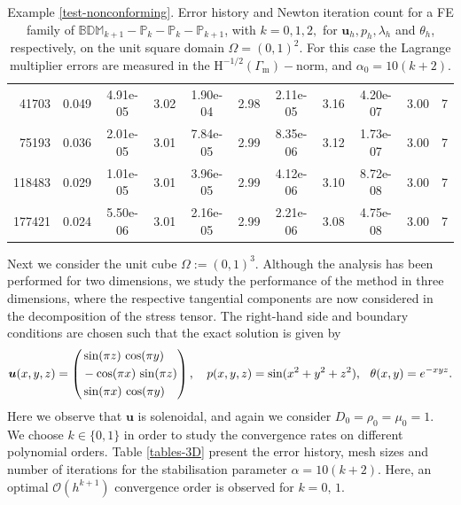\documentclass[onefignum,onetabnum,reqno,a4paper,final]{siamart250211}
\def\O{\Omega}
\newcommand\bu{\boldsymbol{u}}
\newcommand\0{\mathbf{0}}
\renewcommand\H{\mathrm{H}}
\renewcommand\O{\Omega}
\newcommand\Gm{\Gamma_{\mathrm{m}}}
\newcommand{\cred}[1]{{\leavevmode\color{red}{#1}}}
\numberwithin{figure}{section}
\numberwithin{table}{section}
\begin{document}
\begin{table}[t!]
{\begin{tabular}{|rcccccccccc|}
 41703 & 0.049 & 4.91e-05 & 3.02 & 1.90e-04 & 2.98 & 2.11e-05 & 3.16 & 4.20e-07 & 3.00 &  7 \\
 75193 & 0.036 & 2.01e-05 & 3.01 & 7.84e-05 & 2.99 & 8.35e-06 & 3.12 & 1.73e-07 & 3.00 &  7 \\
118483 & 0.029 & 1.01e-05 & 3.01 & 3.96e-05 & 2.99 & 4.12e-06 & 3.10 & 8.72e-08 & 3.00 &  7 \\
177421 & 0.024 & 5.50e-06 & 3.01 & 2.16e-05 & 2.99 & 2.21e-06 & 3.08 & 4.75e-08 & 3.00 &  7 \\
				\hline
				\hline
		\end{tabular}}
		\smallskip
		\caption{Example \ref{test-nonconforming}. 
  Error history and Newton iteration count for a FE family of $\mathbb{BDM}_{k+1}-\mathbb{P}_{k}- \mathbb{P}_{k} - \mathbb{P}_{k+1}$, with $k=0,1,2,$ for $\bu_h, p_h,\lambda_h$ and $\theta_h$, respectively, on the unit square domain $\O=(0,1)^2$. For this case the Lagrange multiplier errors are measured in the $\H^{-1/2}(\Gm)-$norm, and $\alpha_0=10(k+2)$. }
		\label{tables-1to4}
	\end{table}	
	
    Next we consider the unit cube $\O:=(0,1)^3$. Although the analysis has been performed for two dimensions, we study the performance of the method in three dimensions, where the respective tangential components are now considered in the decomposition of the stress tensor. The right-hand side and boundary conditions are chosen such that the exact solution is given by
    $$
	\bu(x,y,z)=\left(
	\begin{aligned}
		&\sin(\pi z)\,\cos(\pi y)\\
		&-\cos(\pi x)\,\sin(\pi z)\\
        &\sin(\pi x)\,\cos(\pi y)
	\end{aligned}
	\right), \quad p(x,y,z)=\sin(x^2+y^2+z^2), \quad \hspace{-0.1cm} \theta(x,y)=e^{-xyz}.
	$$
    Here we observe that $\bu$ is solenoidal, and again we consider $D_0=\rho_0=\mu_0=1$. We choose $k\in\{0,1\}$ in order to study the convergence rates on different polynomial orders.
%
    Table \ref{tables-3D} present the error history, mesh sizes and number of iterations for the stabilisation parameter $\alpha=10(k+2)$. Here, an optimal  $\mathcal{O}(h^{k+1})$ convergence order is observed for $k=0, \,1$. 
    
\end{document}
